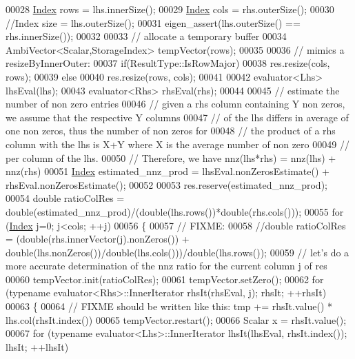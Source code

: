\begin{DoxyCode}
00028   \hyperlink{namespace_eigen_a62e77e0933482dafde8fe197d9a2cfde}{Index} rows = lhs.innerSize();
00029   \hyperlink{namespace_eigen_a62e77e0933482dafde8fe197d9a2cfde}{Index} cols = rhs.outerSize();
00030   \textcolor{comment}{//Index size = lhs.outerSize();}
00031   eigen\_assert(lhs.outerSize() == rhs.innerSize());
00032 
00033   \textcolor{comment}{// allocate a temporary buffer}
00034   AmbiVector<Scalar,StorageIndex> tempVector(rows);
00035 
00036   \textcolor{comment}{// mimics a resizeByInnerOuter:}
00037   \textcolor{keywordflow}{if}(ResultType::IsRowMajor)
00038     res.resize(cols, rows);
00039   \textcolor{keywordflow}{else}
00040     res.resize(rows, cols);
00041   
00042   evaluator<Lhs> lhsEval(lhs);
00043   evaluator<Rhs> rhsEval(rhs);
00044   
00045   \textcolor{comment}{// estimate the number of non zero entries}
00046   \textcolor{comment}{// given a rhs column containing Y non zeros, we assume that the respective Y columns}
00047   \textcolor{comment}{// of the lhs differs in average of one non zeros, thus the number of non zeros for}
00048   \textcolor{comment}{// the product of a rhs column with the lhs is X+Y where X is the average number of non zero}
00049   \textcolor{comment}{// per column of the lhs.}
00050   \textcolor{comment}{// Therefore, we have nnz(lhs*rhs) = nnz(lhs) + nnz(rhs)}
00051   \hyperlink{namespace_eigen_a62e77e0933482dafde8fe197d9a2cfde}{Index} estimated\_nnz\_prod = lhsEval.nonZerosEstimate() + rhsEval.nonZerosEstimate();
00052 
00053   res.reserve(estimated\_nnz\_prod);
00054   \textcolor{keywordtype}{double} ratioColRes = double(estimated\_nnz\_prod)/(double(lhs.rows())*\textcolor{keywordtype}{double}(rhs.cols()));
00055   \textcolor{keywordflow}{for} (\hyperlink{namespace_eigen_a62e77e0933482dafde8fe197d9a2cfde}{Index} j=0; j<cols; ++j)
00056   \{
00057     \textcolor{comment}{// FIXME:}
00058     \textcolor{comment}{//double ratioColRes = (double(rhs.innerVector(j).nonZeros()) +
       double(lhs.nonZeros())/double(lhs.cols()))/double(lhs.rows());}
00059     \textcolor{comment}{// let's do a more accurate determination of the nnz ratio for the current column j of res}
00060     tempVector.init(ratioColRes);
00061     tempVector.setZero();
00062     \textcolor{keywordflow}{for} (\textcolor{keyword}{typename} evaluator<Rhs>::InnerIterator rhsIt(rhsEval, j); rhsIt; ++rhsIt)
00063     \{
00064       \textcolor{comment}{// FIXME should be written like this: tmp += rhsIt.value() * lhs.col(rhsIt.index())}
00065       tempVector.restart();
00066       Scalar x = rhsIt.value();
00067       \textcolor{keywordflow}{for} (\textcolor{keyword}{typename} evaluator<Lhs>::InnerIterator lhsIt(lhsEval, rhsIt.index()); lhsIt; ++lhsIt)

\end{DoxyCode}
